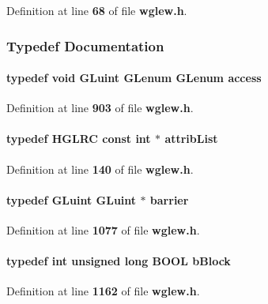 Definition at line {\bf 68} of file {\bf wglew.\+h}.



\subsubsection{Typedef Documentation}
\paragraph[{access}]{\setlength{\rightskip}{0pt plus 5cm}typedef {\bf void} {\bf G\+Luint} {\bf G\+Lenum} {\bf G\+Lenum} {\bf access}}\label{wglew_8h_aeaa124685fd30a946bbb2dbd08110916}


Definition at line {\bf 903} of file {\bf wglew.\+h}.

\paragraph[{attrib\+List}]{\setlength{\rightskip}{0pt plus 5cm}typedef {\bf H\+G\+L\+RC} const {\bf int} $\ast$ {\bf attrib\+List}}\label{wglew_8h_ac0af107519b9e50064be3ae744e2f6c2}


Definition at line {\bf 140} of file {\bf wglew.\+h}.

\paragraph[{barrier}]{\setlength{\rightskip}{0pt plus 5cm}typedef {\bf G\+Luint} {\bf G\+Luint} $\ast$ {\bf barrier}}\label{wglew_8h_a78bd9428b187e1d2cca0eca84ca713e1}


Definition at line {\bf 1077} of file {\bf wglew.\+h}.

\paragraph[{b\+Block}]{\setlength{\rightskip}{0pt plus 5cm}typedef {\bf int} unsigned long {\bf B\+O\+OL} {\bf b\+Block}}\label{wglew_8h_a11cb1b052cc99b30dfc15f79929d6d50}


Definition at line {\bf 1162} of file {\bf wglew.\+h}.

